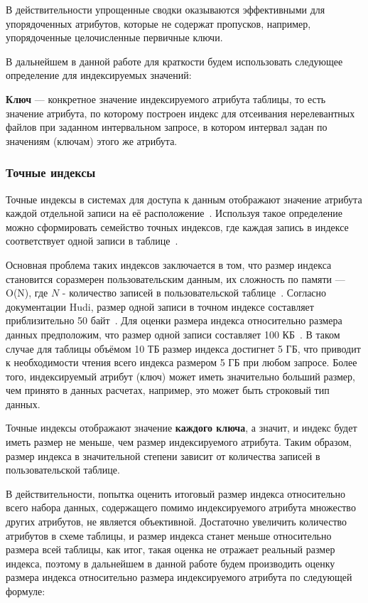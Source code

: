 В действительности упрощенные сводки оказываются эффективными для упорядоченных атрибутов, которые не содержат пропусков, например, упорядоченные целочисленные первичные ключи.

В дальнейшем в данной работе для краткости будем использовать следующее определение для индексируемых значений:
\begin{definition}
    \textbf{Ключ} --- конкретное значение индексируемого атрибута таблицы, то есть значение атрибута, по которому построен индекс для отсеивания нерелевантных файлов при заданном интервальном запросе, в котором интервал задан по значениям (ключам) этого же атрибута.
\end{definition}


\subsubsection{Точные индексы} 

Точные индексы в системах для доступа к данным отображают значение атрибута каждой отдельной записи на её расположение~\cite{Hudi_RLI}. Используя такое определение можно сформировать семейство точных индексов, где каждая запись в индексе соответствует одной записи в таблице~\cite{Tree_Data_Structures_and_Efficient_Indexing_Techniques}.

Основная проблема таких индексов заключается в том, что размер индекса становится соразмерен пользовательским данным, их сложность по памяти --- O(N), где $N$ - количество записей в пользовательской таблице~\cite{Tree_Data_Structures_and_Efficient_Indexing_Techniques}. Согласно документации Hudi, размер одной записи в точном индексе составляет приблизительно 50 байт~\cite{Hudi_RLI}. Для оценки размера индекса относительно размера данных предположим, что размер одной записи составляет 100 КБ~\cite{Hudi_RLI}. В таком случае для таблицы объёмом 10 ТБ размер индекса достигнет 5 ГБ, что приводит к необходимости чтения всего индекса размером 5 ГБ при любом запросе. Более того, индексируемый атрибут (ключ) может иметь значительно больший размер, чем принято в данных расчетах, например, это может быть строковый тип данных.

Точные индексы отображают значение \textbf{каждого ключа}, а значит, и индекс будет иметь размер не меньше, чем размер индексируемого атрибута. Таким образом, размер индекса в значительной степени зависит от количества записей в пользовательской таблице.

В действительности, попытка оценить итоговый размер индекса относительно всего набора данных, содержащего помимо индексируемого атрибута множество других атрибутов, не является объективной. Достаточно увеличить количество атрибутов в схеме таблицы, и размер индекса станет меньше относительно размера всей таблицы, как итог, такая оценка не отражает реальный размер индекса, поэтому в дальнейшем в данной работе будем производить оценку размера индекса относительно размера индексируемого атрибута по следующей формуле:

